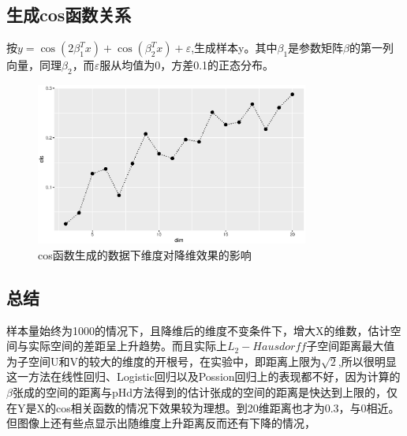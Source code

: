 \subsection{生成cos函数关系}
按$y=\cos(2\beta_1^Tx)+\cos(\beta_2^Tx)+\varepsilon$,生成样本y。其中$\beta_1$是参数矩阵$\beta$的第一列向量，同理$\beta_2$，而$\varepsilon$服从均值为0，方差0.1的正态分布。
\begin{figure}[H]
    \centering
    \includegraphics[width=0.8\textwidth]{image/cos_phd.eps}
    \caption{cos函数生成的数据下维度对降维效果的影响}
\end{figure}

\subsection{总结}
样本量始终为1000的情况下，且降维后的维度不变条件下，增大X的维数，估计空间与实际空间的差距呈上升趋势。而且实际上$L_2-Hausdorff$子空间距离最大值为子空间U和V的较大的维度的开根号，在实验中，即距离上限为$\sqrt{2}$,所以很明显这一方法在线性回归、Logistic回归以及Possion回归上的表现都不好，因为计算的$\beta$张成的空间的距离与pHd方法得到的估计张成的空间的距离是快达到上限的，仅在Y是X的cos相关函数的情况下效果较为理想。到20维距离也才为0.3，与0相近。但图像上还有些点显示出随维度上升距离反而还有下降的情况，


